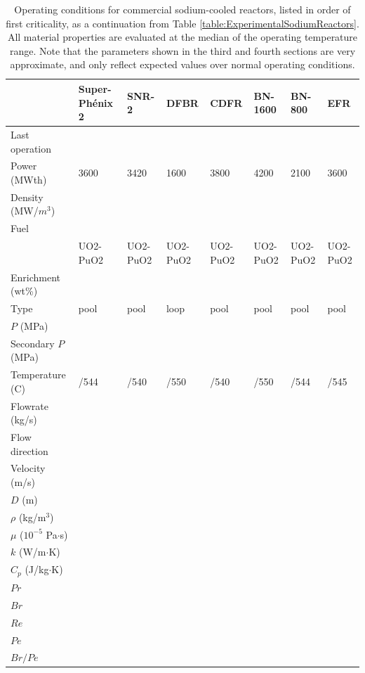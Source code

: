 \documentclass[10pt]{article}
\numberwithin{equation}{section} %
\begin{document}
\clearpage
\begin{table}
\begin{table}[H]
\caption{Operating conditions for commercial sodium-cooled reactors, listed in order of first criticality, as a continuation from Table \ref{table:ExperimentalSodiumReactors}. All material properties are evaluated at the median of the operating temperature range. Note that the parameters shown in the third and fourth sections are very approximate, and only reflect expected values over normal operating conditions. }
\centering
\begin{tabular}{l l l l l l l l}
\hline\hline
 								& Super-Ph\'{e}nix 2	& SNR-2		& DFBR		& CDFR		& BN-1600	& BN-800		& EFR\\ [0.5ex]
\hline
 Last operation						& \\
 Power (MWth)						& 3600			& 3420		& 1600		& 3800		& 4200		& 2100		& 3600\\
 Density (MW/\(m^3\))				& 				& 				& 			&			& 			& 			& \\
 \hdashline
 Fuel	 							& 				& 				& 			&			& \\
 								& UO2-PuO2		& UO2-PuO2		& UO2-PuO2	& UO2-PuO2	& UO2-PuO2	& UO2-PuO2	& UO2-PuO2\\
 Enrichment (wt\%)					& 				& 				&			& 			& \\
 \hdashline
 Type							& pool			& pool			& loop		& pool		& pool		& pool		& pool\\
 \(P\) (MPa)						&				& 				&			& 			& \\
 Secondary \(P\) (MPa)				& 				&				&			& 			& \\
 Temperature (C)					& /544			& /540			& /550		& /540		& /550		& /544		& /545\\
 Flowrate (kg/s)						& 			& \\
 Flow direction						& 			& \\
 \hdashline
 Velocity (m/s)						& 			& \\
  \(D\) (m)							&			& \\
 \(\rho\) (kg/\(\textrm{m}^3\))			&			& \\
 \(\mu\) (\(10^{-5}\) Pa\(\cdot\)s)			& 			& \\
 \(k\) (W/m\(\cdot\)K)					& 			& \\
 \(C_p\) (J/kg\(\cdot\)K)				& 			& \\
 \hdashline
 \(Pr\)							& 			& \\
 \(Br\)							&			& \\
 \(Re\)							&			& \\
 \(Pe\)							&			& \\
 \(Br/Pe\)							& 			& \\
\hline
\end{tabular}
\label{table:CommercialSodiumReactors}
\end{table}
\end{table}
\end{document}
